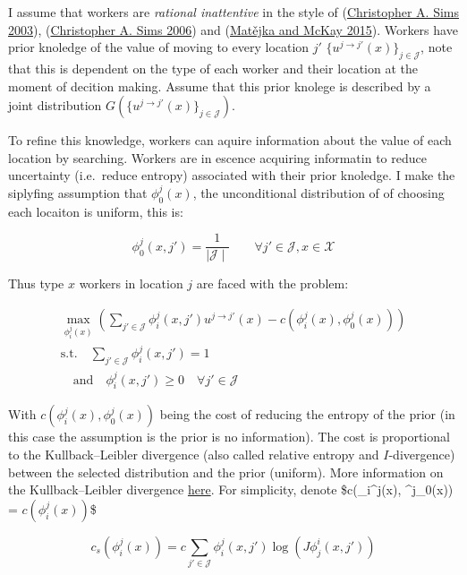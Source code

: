 \documentclass[
  letterpaper,
  DIV=11,
  numbers=noendperiod]{scrreprt}
\begin{document}
I assume that workers are \emph{rational inattentive} in the style of
(\protect\hyperlink{ref-simsImplicationsRationalInattention2003}{Christopher
A. Sims 2003}),
(\protect\hyperlink{ref-simsRationalInattentionLinearQuadratic2006}{Christopher
A. Sims 2006}) and
(\protect\hyperlink{ref-matejkaRationalInattentionDiscrete2015}{Matějka
and McKay 2015}). Workers have prior knoledge of the value of moving to
every location \(j'\) \(\{u^{j\to j'}(x)\}_{j \in \mathcal{J}}\), note
that this is dependent on the type of each worker and their location at
the moment of decition making. Assume that this prior knolege is
described by a joint distribution
\(G\left(\{u^{j\to j'}(x)\}_{j \in \mathcal{J}} \right)\).

To reﬁne this knowledge, workers can aquire information about the value
of each location by searching. Workers are in escence acquiring
informatin to reduce uncertainty (i.e.~reduce entropy) associated with
their prior knoledge. I make the siplyfing assumption that
\(\phi^j_0(x)\), the unconditional distribution of of choosing each
locaiton is uniform, this is:

\[\phi^j_0(x, j') = \frac{1}{\mid \mathcal{J} \mid} \qquad 
\forall j' \in \mathcal{J}, x \in \mathcal{X}\]

Thus type \(x\) workers in location \(j\) are faced with the problem:

\begin{align*}
\max_{\phi_i^j(x)} \left( \sum_{j' \in \mathcal{J}} \phi_i^j(x, j') u^{j\to j'}(x) - c(\phi_i^j(x), \phi^j_0(x))  \right)\\
\text{s.t.} \quad \sum_{j'\in \mathcal{J}}\phi^j_i(x, j') = 1 \\
\quad \text{and} \quad \phi^j_i(x, j') \geq 0 \quad \forall j' \in \mathcal{J}
\end{align*}

With \(c(\phi_i^j(x), \phi^j_0(x))\) being the cost of reducing the
entropy of the prior (in this case the assumption is the prior is no
information). The cost is proportional to the Kullback--Leibler
divergence (also called relative entropy and \(I\)-divergence) between
the selected distribution and the prior (uniform). More information on
the Kullback--Leibler divergence
\href{https://en.wikipedia.org/wiki/Kullback\%E2\%80\%93Leibler_divergence}{here}.
For simplicity, denote \$c(\phi\_i\^{}j(x), \phi\^{}j\_0(x)) =
\(c(\phi_i^j(x))\)\$

\begin{equation}
\label{eq-cost-search}
c_s(\phi^j_i(x)) = c \sum_{j'\in \mathcal{J}}\phi^j_i(x, j')\log{(J\phi^i_j(x, j'))}
\end{equation}
\end{document}
